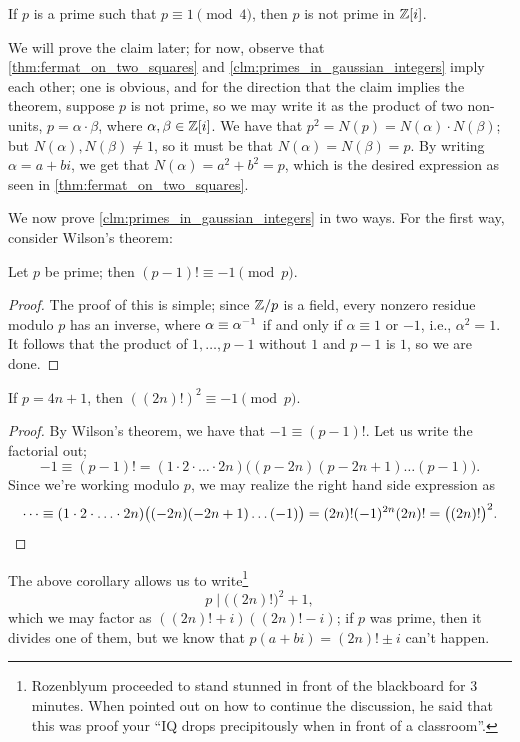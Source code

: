 \begin{claim} \label{clm:primes_in_gaussian_integers}
    If $p$ is a prime such that $p \equiv 1 \pmod{4}$, then $p$ is not prime in $\mathbb Z[i]$.
\end{claim}
We will prove the claim later; for now, observe that \ref{thm:fermat_on_two_squares} and \ref{clm:primes_in_gaussian_integers} imply each other; one is obvious, and for the direction that the claim implies the theorem, suppose $p$ is not prime, so we may write it as the product of two non-units, $p = \alpha \cdot \beta$, where $\alpha, \beta \in \mathbb Z[i]$. We have that $p^2 = N(p) = N(\alpha) \cdot N(\beta)$; but $N(\alpha), N(\beta) \neq 1$, so it must be that $N(\alpha) = N(\beta) = p$. By writing $\alpha = a + bi$, we get that $N(\alpha) = a^2 + b^2 = p$, which is the desired expression as seen in \ref{thm:fermat_on_two_squares}.

We now prove \ref{clm:primes_in_gaussian_integers} in two ways. For the first way, consider Wilson's theorem:
\begin{theorem}[Wilson] \label{thm:wilson}
    Let $p$ be prime; then $(p-1)! \equiv -1 \pmod{p}$.
\end{theorem}
\begin{proof}
    The proof of this is simple; since $\mathbb Z/p$ is a field, every nonzero residue modulo $p$ has an inverse, where $\alpha \equiv \alpha^{-1}$ if and only if $\alpha \equiv 1$ or $-1$, i.e., $\alpha^2 = 1$. It follows that the product of $1, \dots, p-1$ without $1$ and $p-1$ is $1$, so we are done.
\end{proof}
\begin{corollary} \label{cor:wilson}
    If $p = 4n + 1$, then $(\!(2n)!)^2 \equiv -1 \pmod{p}$.
\end{corollary}
\begin{proof}
    By Wilson's theorem, we have that $-1 \equiv (p-1)!$. Let us write the factorial out;
    \[ -1 \equiv (p-1)! = (1 \cdot 2 \cdot \ldots \cdot 2n) \bigl((p - 2n) (p - 2n + 1) \dots (p-1)\bigr). \]
    Since we're working modulo $p$, we may realize the right hand side expression as
    \[ \dots \equiv (1 \cdot 2 \cdot \ldots \cdot 2n)\bigl((-2n) (-2n + 1) \dots (-1)\bigr) = (2n)! (-1)^{2n} (2n)! = \bigl((2n)!\bigr)^2. \qedhere \]
\end{proof} \vspace{-8pt}
The above corollary allows us to write\footnote{Rozenblyum proceeded to stand stunned in front of the blackboard for 3 minutes. When pointed out on how to continue the discussion, he said that this was proof your ``IQ drops precipitously when in front of a classroom''.}
\[ p \mid \bigl((2n)!\bigr)^2 + 1, \]
which we may factor as $(\!(2n)! + i)(\!(2n)! - i)$; if $p$ was prime, then it divides one of them, but we know that $p (a + bi) = (2n)! \pm i$ can't happen.

